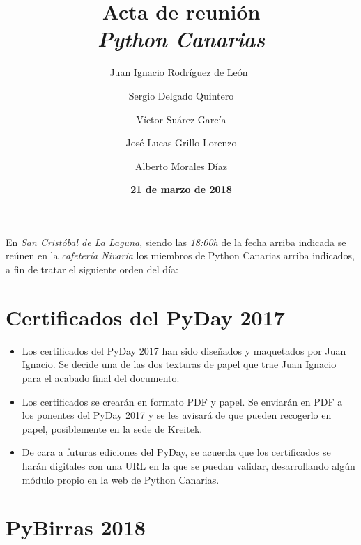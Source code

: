 \documentclass[a4paper, 12pt]{article}
\title{\huge \textbf{Acta de reunión} \\ \textit{Python Canarias}}
\date{\textbf{21 de marzo de 2018}}
\author{Juan Ignacio Rodríguez de León\ \and Sergio Delgado Quintero \and Víctor Suárez García \and José Lucas Grillo Lorenzo \and Alberto Morales Díaz}
\begin{document}
\renewcommand{\contentsname}{Orden del día}

\maketitle

En \textit{San Cristóbal de La Laguna}, siendo las \textit{18:00h} de la fecha arriba indicada se reúnen en la \textit{cafetería Nivaria} los miembros de Python Canarias arriba indicados, a fin de tratar el siguiente orden del día:

\tableofcontents

\section{Certificados del PyDay 2017}

\begin{itemize}
    \item Los certificados del PyDay 2017 han sido diseñados y maquetados por Juan Ignacio. Se decide una de las dos texturas de papel que trae Juan Ignacio para el acabado final del documento.
    \item Los certificados se crearán en formato PDF y papel. Se enviarán en PDF a los ponentes del PyDay 2017 y se les avisará de que pueden recogerlo en papel, posiblemente en la sede de Kreitek.
    \item De cara a futuras ediciones del PyDay, se acuerda que los certificados se harán digitales con una URL en la que se puedan validar, desarrollando algún módulo propio en la web de Python Canarias.
\end{itemize}

\section{PyBirras 2018}
\end{document}
